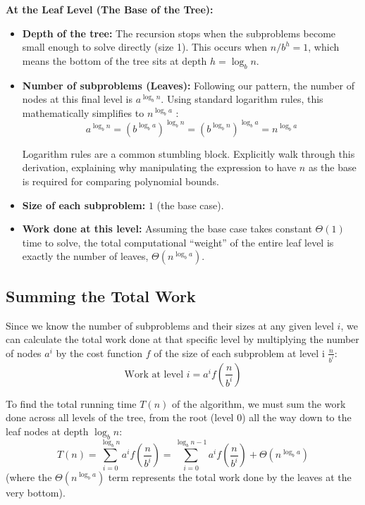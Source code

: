 \vspace{0.5cm}
\noindent\textbf{At the Leaf Level (The Base of the Tree):}
\begin{itemize}
    \item \textbf{Depth of the tree:} The recursion stops when the subproblems become small enough to solve directly (size 1). This occurs when $n/b^h= 1$, which means the bottom of the tree sits at depth $h = \log_b n$.
    \item \textbf{Number of subproblems (Leaves):} Following our pattern, the number of nodes at this final level is $a^{\log_b n}$. Using standard logarithm rules, this mathematically simplifies to $n^{\log_b a}$ :
        \[ a^{\log_b n} = (b^{\log_b a})^{\log_b n} = (b^{\log_b n})^{\log_b a} = n^{\log_b a} \]

        \begin{educatortip}
            Logarithm rules are a common stumbling block. Explicitly walk through this derivation, explaining why manipulating the expression to have $n$ as the base is required for comparing polynomial bounds.
        \end{educatortip}
    \item \textbf{Size of each subproblem:} $1$ (the base case).
    \item \textbf{Work done at this level:} Assuming the base case takes constant $\Theta(1)$ time to solve, the total computational ``weight'' of the entire leaf level is exactly the number of leaves, $\Theta(n^{\log_b a})$. 
\end{itemize}

\subsection{Summing the Total Work} 
Since we know the number of subproblems and their sizes at any given level $i$, we can calculate the total work done at that specific level by multiplying the number of nodes $a^i$ by the cost function $f$ of the size of each subproblem at level i $\frac{n}{b^i}$:
\begin{equation*}
    \text{Work at level } i = a^i f\left(\frac{n}{b^i}\right)
\end{equation*}

To find the total running time $T(n)$ of the algorithm, we must sum the work done across all levels of the tree, from the root (level 0) all the way down to the leaf nodes at depth $\log_b n$:
\begin{equation*}
    T(n) = \sum_{i=0}^{\log_b n} a^i f\left(\frac{n}{b^i}\right) = \sum_{i=0}^{\log_b n - 1} a^i f\left(\frac{n}{b^i}\right) + \Theta(n^{\log_b a})
\end{equation*}
(where the $\Theta(n^{\log_b a})$ term represents the total work done by the leaves at the very bottom).

